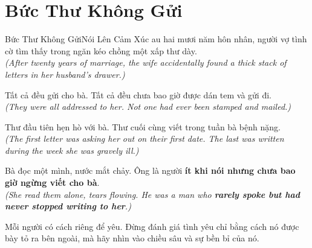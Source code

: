 \section{Bức Thư Không Gửi}
\begin{truyen}{Bức Thư Không Gửi}{Nói Lên Cảm Xúc}
au hai mươi năm hôn nhân, người vợ tình cờ tìm thấy trong ngăn kéo chồng một xấp thư dày.\\
\textit{(After twenty years of marriage, the wife accidentally found a thick stack of letters in her husband's drawer.)}

Tất cả đều gửi cho bà. Tất cả đều chưa bao giờ được dán tem và gửi đi.\\
\textit{(They were all addressed to her. Not one had ever been stamped and mailed.)}

Thư đầu tiên hẹn hò với bà. Thư cuối cùng viết trong tuần bà bệnh nặng.\\
\textit{(The first letter was asking her out on their first date. The last was written during the week she was gravely ill.)}

Bà đọc một mình, nước mắt chảy. Ông là người \textbf{ít khi nói nhưng chưa bao giờ ngừng viết cho bà}.\\
\textit{(She read them alone, tears flowing. He was a man who \textbf{rarely spoke but had never stopped writing to her}.)}
\end{truyen}
\begin{baihoc}
  Mỗi người có cách riêng để yêu. Đừng đánh giá tình yêu chỉ bằng cách nó được bày tỏ ra bên ngoài, mà hãy nhìn vào chiều sâu và sự bền bỉ của nó.
\end{baihoc}

